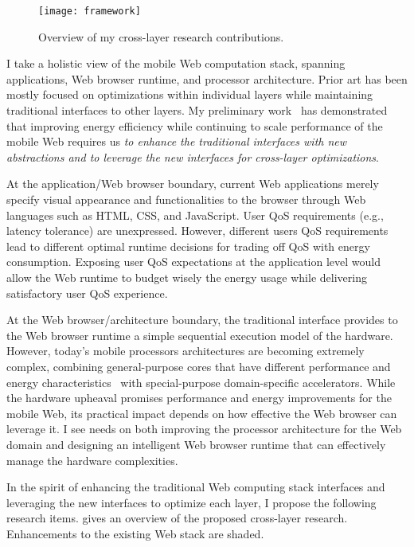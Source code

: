 \begin{sidewaysfigure}
    \centering
    \texttt{[image: framework]}
    \caption{Overview of my cross-layer research contributions.}
    \label{fig:framework}
\end{sidewaysfigure}

I take a holistic view of the mobile Web computation stack, spanning applications, Web browser runtime, and processor architecture. Prior art has been mostly focused on optimizations within individual layers while maintaining traditional interfaces to other layers. My preliminary work~\cite{big-little,zhu2014exploiting,zhu2015role,webcore,ebs,greenweb,mobilecpu,eve-char} has demonstrated that improving energy efficiency while continuing to scale performance of the mobile Web requires us \textit{to enhance the traditional interfaces with new abstractions and to leverage the new interfaces for cross-layer optimizations}.

At the application/Web browser boundary, current Web applications merely specify visual appearance and functionalities to the browser through Web languages such as HTML, CSS, and JavaScript. User QoS requirements (e.g., latency tolerance) are unexpressed. However, different users QoS requirements lead to different optimal runtime decisions for trading off QoS with energy consumption. Exposing user QoS expectations at the application level would allow the Web runtime to budget wisely the energy usage while delivering satisfactory user QoS experience.

At the Web browser/architecture boundary, the traditional interface provides to the Web browser runtime a simple sequential execution model of the hardware.  However, today's mobile processors architectures are becoming extremely complex, combining general-purpose cores that have different performance and energy characteristics~\cite{single-ISA} with special-purpose domain-specific accelerators. While the hardware upheaval promises performance and energy improvements for the mobile Web, its practical impact depends on how effective the Web browser can leverage it. I see needs on both improving the processor architecture for the Web domain and designing an intelligent Web browser runtime that can effectively manage the hardware complexities.

In the spirit of enhancing the traditional Web computing stack interfaces and leveraging the new interfaces to optimize each layer, I propose the following research items.  gives an overview of the proposed cross-layer research. Enhancements to the existing Web stack are shaded.

